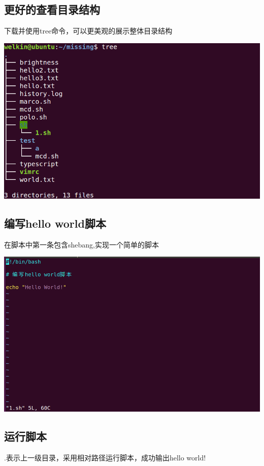 \documentclass[UTF8,a4paper]{ctexart}
\begin{document}
\begin{sloppypar}
	\subsection{更好的查看目录结构}
	下载并使用tree命令，可以更美观的展示整体目录结构
	
	\includegraphics[width = 16cm]{11}
	
	\subsection{编写hello world脚本}
	在脚本中第一条包含shebang,实现一个简单的脚本
	
	\includegraphics[width = 16cm]{12}
	
	\subsection{运行脚本}
	.表示上一级目录，采用相对路径运行脚本，成功输出hello world!
	

\end{sloppypar}
\end{document}
